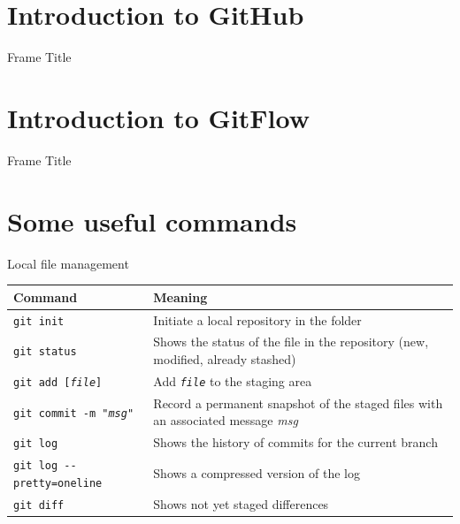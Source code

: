 \documentclass{beamer}
\newcommand{\cd}[1]{\texttt{#1}}
\begin{document}
\section{Introduction to GitHub}
\begin{frame}{Frame Title}
\end{frame}

\section{Introduction to GitFlow}
\begin{frame}{Frame Title}
\end{frame}

\section{Some useful commands}
\begin{frame}{Local file management}
\begin{table}
    \scriptsize
    \centering
    \begin{tabular}{p{}p{}}
        \toprule
        \alert{Command}	&	\alert{Meaning}\\
        \midrule
        \cd{git init}	&	Initiate a local repository in the folder\\
        \cd{git status}	&	Shows the status of the file in the repository (new, modified, already stashed)\\
        \cd{git add [\textit{file}]}	&	Add \cd{\textit{file}} to the staging area\\
        \cd{git commit -m "\textit{msg}"} & Record a permanent snapshot of the staged files with an associated message \textit{msg}\\
        \cd{git log}	&	Shows the history of commits for the current branch\\
        \cd{git log -{}-pretty=oneline}	&	Shows a compressed version of the log\\
        \cd{git diff}	&	Shows not yet staged differences\\
        \bottomrule
    \end{tabular}
\end{table}
\end{frame}
\end{document}
